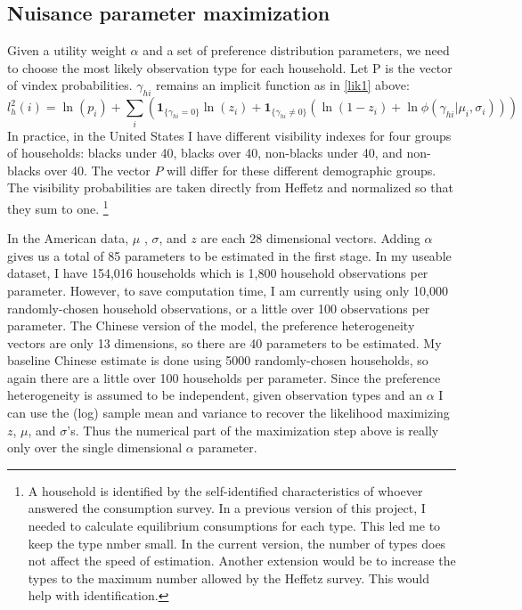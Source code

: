 \documentclass[12pt]{article}
\begin{document}
\subsection{Nuisance parameter maximization}

Given a utility weight $\alpha$ and a set of preference distribution parameters, we need to choose the most likely observation type for each household. Let P is the vector of vindex probabilities.  $\gamma_{hi}$ remains an implicit function as in \eqref{lik1} above:
\begin{equation}
    \label{lik2}
    l_h^2(i) = \ln(p_i) + \sum_{i} \left(\mathbf{1}_{\{\gamma_{hi} = 0\}}\ln\left(z_i\right) + \mathbf{1}_{\{\gamma_{hi} \neq 0\}} \left(\ln\left(1-z_i\right)+\ln \phi(\gamma_{hi}|\mu_i,\sigma_i)\right)\right)
\end{equation}
In practice, in the United States I have different visibility indexes for four groups of households: blacks under 40, blacks over 40, non-blacks under 40, and non-blacks over 40.
The vector $P$ will differ for these different demographic groups.
The visibility probabilities are taken directly from Heffetz and normalized so that they sum to one.
\footnote{A household is identified by the self-identified characteristics of whoever answered the consumption survey. 
In a previous version of this project, I needed to calculate equilibrium consumptions for each type.  This led me to keep the type nmber small.  In the current version, the number of types does not affect the speed of estimation.  Another extension would be to increase the types to the maximum number allowed by the Heffetz survey. This would help with identification.}

In the American data, $\mu$ , $\sigma$, and $z$ are each 28 dimensional vectors. Adding $\alpha$ gives us a total of 85 parameters to be estimated in the first stage.   
In my useable dataset, I have 154,016 households which is 1,800 household observations per parameter.
However, to save computation time, I am currently using only 10,000 randomly-chosen household observations, or a little over 100 observations per parameter.
The Chinese version of the model, the preference heterogeneity vectors are only 13 dimensions, so there are 40 parameters to be estimated.  My baseline Chinese estimate is done using 5000 randomly-chosen households, so again there are a little over 100 households per parameter.
Since the preference heterogeneity is assumed to be independent, given observation types and an $\alpha$ I can use the (log) sample mean and variance to recover the likelihood maximizing $z$, $\mu$, and $\sigma$'s.
Thus the numerical part of the maximization step above is really only over the single dimensional $\alpha$ parameter.
\end{document}
